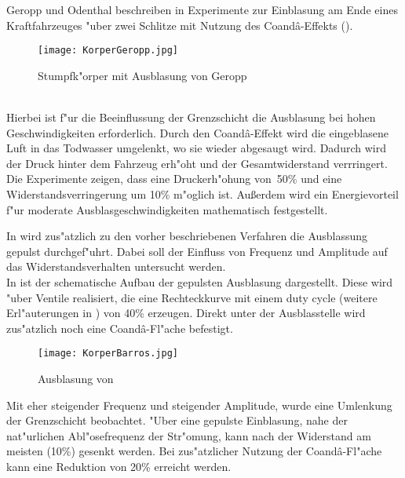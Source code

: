 Geropp und Odenthal beschreiben in \cite{Geropp.2000} Experimente zur Einblasung am Ende eines Kraftfahrzeuges "uber zwei Schlitze mit Nutzung des Coand\^{a}-Effekts ().
\begin{figure}[h]
	\centering
	\texttt{[image: KorperGeropp.jpg]}
	\caption{Stumpfk"orper mit Ausblasung von Geropp \cite{Geropp.2000}}
	\label{fig:Geropp}
\end{figure}\\
Hierbei ist f"ur die Beeinflussung der Grenzschicht die Ausblasung bei hohen Geschwindigkeiten erforderlich. Durch den Coand\^{a}-Effekt wird die eingeblasene Luft in das Todwasser umgelenkt, wo sie wieder abgesaugt wird. Dadurch wird der Druck hinter dem Fahrzeug erh"oht und der Gesamtwiderstand verrringert. Die Experimente zeigen, dass eine Druckerh"ohung von~50\% und eine Widerstandsverringerung um 10\% m"oglich ist. Au\ss{}erdem wird ein Energievorteil f"ur moderate Ausblasgeschwindigkeiten mathematisch festgestellt.

In \cite{Barros.2016} wird zus"atzlich zu den vorher beschriebenen Verfahren die Ausblassung gepulst durchgef"uhrt. Dabei soll der Einfluss von Frequenz und Amplitude auf das Widerstandsverhalten untersucht werden.\\
In  ist der schematische Aufbau der gepulsten Ausblasung dargestellt. Diese wird "uber Ventile realisiert, die eine Rechteckkurve mit einem duty cycle (weitere Erl"auterungen in ) von 40\% erzeugen. Direkt unter der Ausblasstelle wird zus"atzlich noch eine Coand\^{a}-Fl"ache befestigt.\\
\begin{figure}[h]
	\centering
	\texttt{[image: KorperBarros.jpg]}
	\caption{Ausblasung von \cite{Barros.2016}}
	\label{fig:Barros}
\end{figure}
Mit eher steigender Frequenz und steigender Amplitude, wurde eine Umlenkung der Grenzschicht beobachtet. "Uber eine gepulste Einblasung, nahe der nat"urlichen Abl"osefrequenz der Str"omung, kann nach \cite{Barros.2016} der Widerstand am meisten (10\%) gesenkt werden. Bei zus"atzlicher Nutzung der Coand\^{a}-Fl"ache kann eine Reduktion von 20\% erreicht werden.

